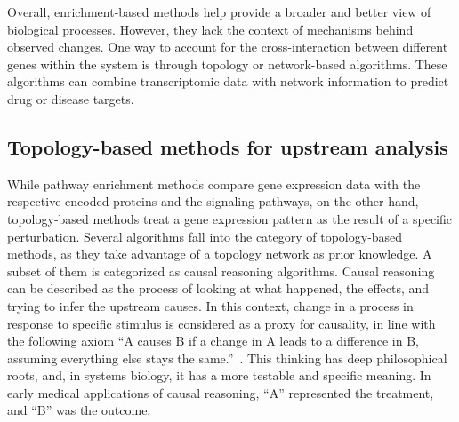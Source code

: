 Overall, enrichment-based methods help provide a broader and better view of biological processes. However, they lack the context of mechanisms behind observed changes. One way to account for the cross-interaction between different genes within the system is through topology or network-based algorithms. These algorithms can combine transcriptomic data with network information to predict drug or disease targets.


\subsection{Topology-based methods for upstream analysis} %
\label{sub:topology_based_methods}

While pathway enrichment methods compare gene expression data with the respective encoded proteins and the signaling pathways, on the other hand, topology-based methods treat a gene expression pattern as the result of a specific perturbation. Several algorithms fall into the category of topology-based methods, as they take advantage of a topology network as prior knowledge. A subset of them is categorized as causal reasoning algorithms. Causal reasoning can be described as the process of looking at what happened, the effects, and trying to infer the upstream causes. In this context, change in a process in response to specific stimulus is considered as a proxy for causality, in line with the following axiom “A causes B if a change in A leads to a difference in B, assuming everything else stays the same.”~\cite{RN157}. This thinking has deep philosophical roots, and, in systems biology, it has a more testable and specific meaning. In early medical applications of causal reasoning, “A” represented the treatment, and “B” was the outcome. 

